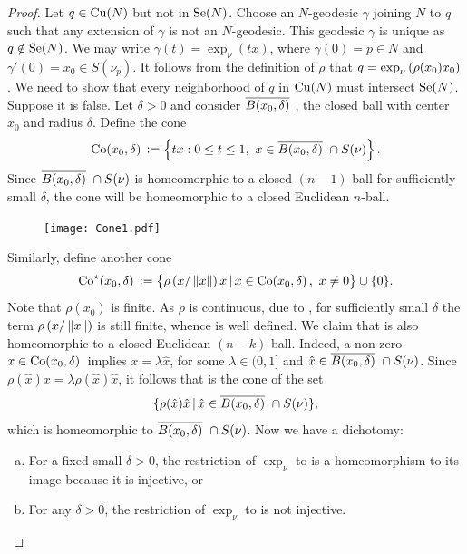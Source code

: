 \begin{proof}
    Let $q\in \mathrm{Cu}(N) $ but not in $\mathrm{Se}(N)$. Choose an $N$-geodesic $\gamma$ joining $N$ to $q$ such that any extension of $\gamma$ is not an $N$-geodesic. This geodesic $\gamma$ is unique as $q\notin \mathrm{Se}(N)$. We may write $\gamma(t) = \exp_\nu(tx)$, where $\gamma(0)=p\in N$ and $\gamma'(0)=x_0\in S(\nu_p)$. It follows from the definition of $\rho$ that $q=\exp_\nu\left( \rho(x_0)x_0 \right)$. We need to show that every neighborhood of $q$ in $\mathrm{Cu}(N)$ must intersect $\mathrm{Se}(N)$. Suppose it is false. Let $\delta>0$ and consider $\overline{B(x_0,\delta)}~$, the closed ball with center $x_0$ and radius $\delta$. Define the cone
    \begin{equation*}
        \mathrm{Co}(x_0,\delta)~\! \vcentcolon= \left\{ tx:0\le t\le 1,~ x\in \overline{B(x_0,\delta)}~\cap S(\nu) \right\}.
    \end{equation*}
    Since $\overline{B(x_0,\delta)}~\cap S(\nu)$ is homeomorphic to a closed $(n-1)$-ball for sufficiently small $\delta$, the cone will be homeomorphic to a closed Euclidean $n$-ball.
    \begin{figure}[H] 
        \centering 
        \texttt{[image: Cone1.pdf]} 
        \caption{\co} 
        \label{fig: cone} 
    \end{figure}
    \noindent Similarly, define another cone
    \begin{equation*}
        \mathrm{Co}^\star(x_0,\delta)~\! \vcentcolon= \big\{\rho\left(  x/\left\|x\right\| \right)x\,|\, x\in \mathrm{Co}(x_0,\delta)~\!, ~x\neq 0\big\}\cup \{0\}.
    \end{equation*} 
    Note that $\rho(x_0)$ is finite. As $\rho$ is continuous, due to , for sufficiently small $\delta$ the term $\rho\left( x/\left\|x\right\| \right)$ is still finite, whence \costar is well defined. We claim that \costar is also homeomorphic to a closed Euclidean $(n-k)$-ball. Indeed,  a non-zero $x\in \mathrm{Co}(x_0,\delta)~\!$ implies $x=\lambda \hat{x}$, for some $\lambda \in (0,1]$ and $\hat{x}\in \overline{B(x_0,\delta)}~\cap S(\nu)$. Since $\rho(\hat{x})x = \lambda \rho(\hat{x})\hat{x}$, it follows that \costar is the cone of the set
    \begin{displaymath}
        \{\rho(\hat{x})\hat{x}\,|\,\hat{x}\in \overline{B(x_0,\delta)}~\cap S(\nu)\},
    \end{displaymath}
    which is homeomorphic to $\overline{B(x_0,\delta)}~\cap S(\nu)$. Now we have a dichotomy: 
    \begin{enumerate}[(a)]
        \item For a fixed small $\delta>0$, the restriction of $\exp_\nu$ to \costar is a homeomorphism to its image because it is injective, or
        \item For any $\delta>0$, the restriction of $\exp_\nu$ to \costar is not injective.

\end{enumerate}
\end{proof}
